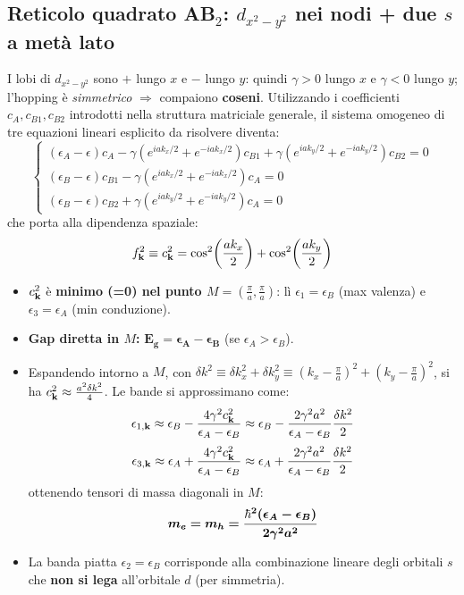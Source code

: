 \subsection{Reticolo quadrato AB$_2$: $d_{x^2-y^2}$ nei nodi + due $s$ a metà lato}
I lobi di $d_{x^2-y^2}$ sono $+$ lungo $x$ e $-$ lungo $y$: quindi $\gamma>0$ lungo $x$ e $\gamma<0$ lungo $y$; l'hopping è \emph{simmetrico} $\Rightarrow$ compaiono \textbf{coseni}.
Utilizzando i coefficienti $c_A, c_{B1}, c_{B2}$ introdotti nella struttura matriciale generale, il sistema omogeneo di tre equazioni lineari esplicito da risolvere diventa:
\[
\begin{cases}
(\epsilon_A - \epsilon)c_A - \gamma\left(e^{i a k_x/2} + e^{-i a k_x/2}\right)c_{B1} + \gamma\left(e^{i a k_y/2} + e^{-i a k_y/2}\right)c_{B2} = 0 \\
(\epsilon_B - \epsilon)c_{B1} - \gamma\left(e^{i a k_x/2} + e^{-i a k_x/2}\right)c_A = 0 \\
(\epsilon_B - \epsilon)c_{B2} + \gamma\left(e^{i a k_y/2} + e^{-i a k_y/2}\right)c_A = 0
\end{cases}
\]
che porta alla dipendenza spaziale:
\[ f_{\mathbf{k}}^2 \equiv c_{\mathbf{k}}^2 = \cos^2\!\left(\frac{ak_x}{2}\right)+\cos^2\!\left(\frac{ak_y}{2}\right) \]
\begin{itemize}
  \item $c_{\mathbf{k}}^2$ è \textbf{minimo (=0) nel punto $M=\left(\frac\pi a,\frac\pi a\right)$}: lì $\epsilon_1 = \epsilon_B$ (max valenza) e $\epsilon_3=\epsilon_A$ (min conduzione).
  \item \textbf{Gap diretta in $M$:} $\bm{E_g = \epsilon_A-\epsilon_B}$ (se $\epsilon_A>\epsilon_B$).
  \item Espandendo intorno a $M$, con $\delta k^2 \equiv \delta k_x^2 + \delta k_y^2 \equiv \left(k_x - \frac{\pi}{a}\right)^2 + \left(k_y - \frac{\pi}{a}\right)^2$, si ha $c_{\mathbf{k}}^2\approx\frac{a^2\delta k^2}{4}$. Le bande si approssimano come:
  \[ \epsilon_{1,\mathbf{k}} \approx \epsilon_B - \frac{4\gamma^2 c_{\mathbf{k}}^2}{\epsilon_A - \epsilon_B} \approx \epsilon_B - \frac{2\gamma^2a^2}{\epsilon_A - \epsilon_B}\frac{\delta k^2}{2} \]
  \[ \epsilon_{3,\mathbf{k}} \approx \epsilon_A + \frac{4\gamma^2 c_{\mathbf{k}}^2}{\epsilon_A - \epsilon_B} \approx \epsilon_A + \frac{2\gamma^2a^2}{\epsilon_A - \epsilon_B}\frac{\delta k^2}{2} \]
  ottenendo tensori di massa diagonali in $M$:
  \[ \bm{m_e = m_h = \frac{\hbar^2(\epsilon_A-\epsilon_B)}{2\gamma^2 a^2}} \]
  \item La banda piatta $\epsilon_2 = \epsilon_B$ corrisponde alla combinazione lineare degli orbitali $s$ che \textbf{non si lega} all'orbitale $d$ (per simmetria).
\end{itemize}


